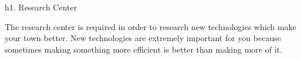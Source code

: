 h1. Research Center

The research center is required in order to research new technologies which make your town better. New technologies are extremely important for you because sometimes making something more efficient is better than making more of it.